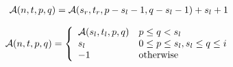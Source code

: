 \begin{eqnarray}  \label{fun:LCA1}
  {\cal A}(n, t, p, q) = {\cal A}(s_r, t_r, p - s_l - 1, q - s_l - 1) + s_l + 1 
\end{eqnarray}


\begin{equation}  \label{fun:LCA2}
    {\cal A}(n, t, p, q) =
    \left\{
    \begin{array}{ll}
      {\cal A}(s_l, t_l, p, q) & p \le q < s_l\\
      s_l & 0 \le p \le s_l, s_l \le q \le i\\
      -1 & \mbox{otherwise} \\
    \end{array}
    \right.
\end{equation}

